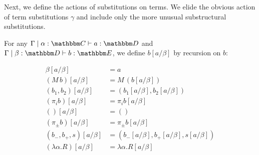 \documentclass{llncs}
\begin{document}
Next, we define the actions of substitutions on terms. We elide the
obvious action of term substitutions $\gamma$ and include only the
more unusual substructural substitutions.
\begin{definition}
  For any $\Gamma \pipe \alpha: \cat C \vdash a : \cat D$ and $\Gamma
  \pipe \beta:\cat D \vdash b : \cat E$, we define $b[a/\beta]$ by
  recursion on $b$:

  \begin{align*}
    \beta[a/\beta] &= a\\
    (M\,b)[a/\beta] &= M\,(b[a/\beta])\\
    (b_1,b_2)[a/\beta] &= (b_1[a/\beta],b_2[a/\beta])\\
    (\pi_i b)[a/\beta] &= \pi_i b[a/\beta]\\
    () [a/\beta] &= () \\
    (\pi_\pm b)[a/\beta] &= \pi_\pm b[a/\beta]\\
    (b_-,b_+,s)[a/\beta] &= (b_-[a/\beta],b_+[a/\beta], s[a/\beta])\\
    (\lambda \alpha.R)[a/\beta] &=\lambda \alpha.R[a/\beta] %
  \end{align*}


\end{definition}
\end{document}
